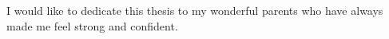 I would like to dedicate this thesis to my wonderful parents who have always made me feel strong and confident. 